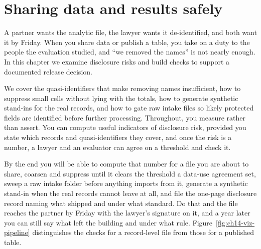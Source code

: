 \chapter{Sharing data and results safely}\label{ch:sharing}

A partner wants the analytic file, the lawyer wants it de-identified, and both want it by Friday. When you share data or publish a table, you take on a duty to the people the evaluation studied, and \enquote{we removed the names} is not nearly enough. In this chapter we examine disclosure risks and build checks to support a documented release decision.

We cover the quasi-identifiers that make removing names insufficient, how to suppress small cells without lying with the totals, how to generate synthetic stand-ins for the real records, and how to gate raw intake files so likely protected fields are identified before further processing.  Throughout, you measure rather than assert. You can compute useful indicators of disclosure risk, provided you state which records and quasi-identifiers they cover, and once the risk is a number, a lawyer and an evaluator can agree on a threshold and check it.

By the end you will be able to compute that number for a file you are about to share, coarsen and suppress until it clears the threshold a data-use agreement set, sweep a raw intake folder before anything imports from it, generate a synthetic stand-in when the real records cannot leave at all, and file the one-page disclosure record naming what shipped and under what standard. Do that and the file reaches the partner by Friday with the lawyer's signature on it, and a year later you can still say what left the building and under what rule. Figure~\ref{fig:ch14-viz-pipeline} distinguishes the checks for a record-level file from those for a published table.

